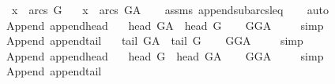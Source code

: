 \begin{isabellebody}
\ \ \ {\isachardoublequoteopen}x\ {\isasymin}\ arcs\ G{\isachardoublequoteclose}\isanewline
\ \ \ {\isachardoublequoteopen}x\ {\isasymin}\ arcs\ G{\isacharunderscore}{\kern0pt}A{\isachardoublequoteclose}\isanewline
%
\isadelimproof
\ \ %
\endisadelimproof
%
\isatagproof
{}\isamarkupfalse%
\ assms\ append{\isacharunderscore}{\kern0pt}subarcs{\isacharunderscore}{\kern0pt}leq\isanewline
\ \ \isamarkupfalse%
\ auto%
\endisatagproof
{\isafoldproof}%
%
\isadelimproof
\isanewline
%
\endisadelimproof
\isanewline
{}\isamarkupfalse%
\ {\isacharparenleft}{\kern0pt}\ Append{\isacharparenright}{\kern0pt}\ append{\isacharunderscore}{\kern0pt}head{\isacharcolon}{\kern0pt}\ \isanewline
\ \ {\isachardoublequoteopen}head\ G{\isacharunderscore}{\kern0pt}A\ {\isacharequal}{\kern0pt}\ head\ G{\isachardoublequoteclose}\isanewline
%
\isadelimproof
\ \ %
\endisadelimproof
%
\isatagproof
{}\isamarkupfalse%
\ GG{\isacharunderscore}{\kern0pt}A\ \isanewline
\ \ \isamarkupfalse%
\ simp%
\endisatagproof
{\isafoldproof}%
%
\isadelimproof
\isanewline
%
\endisadelimproof
\isanewline
{}\isamarkupfalse%
\ {\isacharparenleft}{\kern0pt}\ Append{\isacharparenright}{\kern0pt}\ append{\isacharunderscore}{\kern0pt}tail{\isacharcolon}{\kern0pt}\ \isanewline
\ \ {\isachardoublequoteopen}tail\ G{\isacharunderscore}{\kern0pt}A\ {\isacharequal}{\kern0pt}\ tail\ G{\isachardoublequoteclose}\isanewline
%
\isadelimproof
\ \ %
\endisadelimproof
%
\isatagproof
{}\isamarkupfalse%
\ GG{\isacharunderscore}{\kern0pt}A\ \isanewline
\ \ \isamarkupfalse%
\ simp%
\endisatagproof
{\isafoldproof}%
%
\isadelimproof
\isanewline
%
\endisadelimproof
\isanewline
\isanewline
{}\isamarkupfalse%
\ {\isacharparenleft}{\kern0pt}\ Append{\isacharparenright}{\kern0pt}\ append{\isacharunderscore}{\kern0pt}head{\isacharprime}{\kern0pt}{\isacharcolon}{\kern0pt}\ \isanewline
\ \ {\isachardoublequoteopen}head\ G\ {\isacharequal}{\kern0pt}\ head\ G{\isacharunderscore}{\kern0pt}A{\isachardoublequoteclose}\isanewline
%
\isadelimproof
\ \ %
\endisadelimproof
%
\isatagproof
{}\isamarkupfalse%
\ GG{\isacharunderscore}{\kern0pt}A\ \isanewline
\ \ \isamarkupfalse%
\ simp%
\endisatagproof
{\isafoldproof}%
%
\isadelimproof
\isanewline
%
\endisadelimproof
\isanewline
{}\isamarkupfalse%
\ {\isacharparenleft}{\kern0pt}\ Append{\isacharparenright}{\kern0pt}\ append{\isacharunderscore}{\kern0pt}tail{\isacharprime}{\kern0pt}{\isacharcolon}{\kern0pt}\ \isanewline

\end{isabellebody}
